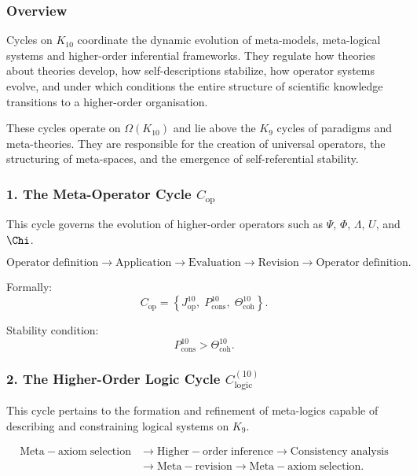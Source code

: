 \subsubsection{Overview}

Cycles on $K_{10}$ coordinate the dynamic evolution of meta-models,
meta-logical systems and higher-order inferential frameworks. They regulate
how theories about theories develop, how self-descriptions stabilize, how
operator systems evolve, and under which conditions the entire structure of
scientific knowledge transitions to a higher-order organisation.

These cycles operate on $\Omega(K_{10})$ and lie above the $K_9$ cycles of
paradigms and meta-theories. They are responsible for the creation of
universal operators, the structuring of meta-spaces, and the emergence of
self-referential stability.


\subsubsection{1. The Meta-Operator Cycle $C_{\mathrm{op}}$}

This cycle governs the evolution of higher-order operators such as
$\Psi$, $\Phi$, $\Lambda$, $U$, and $\Chi$.

\[
  \mathrm{Operator\;definition}
  \to
  \mathrm{Application}
  \to
  \mathrm{Evaluation}
  \to
  \mathrm{Revision}
  \to
  \mathrm{Operator\;definition}.
\]

Formally:
\[
  C_{\mathrm{op}}
  =
  \left\{
    J^{10}_{\mathrm{op}},\;
    P^{10}_{\mathrm{cons}},\;
    \Theta^{10}_{\mathrm{coh}}
  \right\}.
\]

Stability condition:
\[
  P^{10}_{\mathrm{cons}} > \Theta^{10}_\mathrm{coh}.
\]


\subsubsection{2. The Higher-Order Logic Cycle $C_{\mathrm{logic}}^{(10)}$}

This cycle pertains to the formation and refinement of meta-logics capable
of describing and constraining logical systems on $K_9$.

\[
  \begin{aligned}
  \mathrm{Meta\!-\!axiom\;selection}
  &\to \mathrm{Higher\!-\!order\;inference}
  \to \mathrm{Consistency\;analysis}\\
  &\to \mathrm{Meta\!-\!revision}
  \to \mathrm{Meta\!-\!axiom\;selection}.
  \end{aligned}
\]

